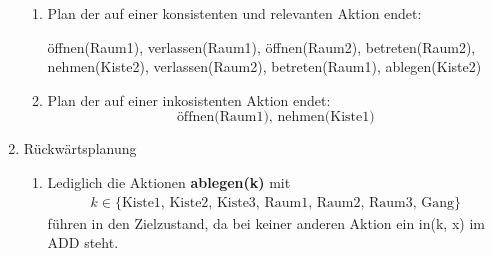 \documentclass[a4paper,10pt]{article}
\begin{document}
\begin{enumerate}[~~a.)]
\begin{enumerate}[~~i)]
        \item Plan der auf einer konsistenten und relevanten Aktion endet:
        \begin{center}
         öffnen(Raum1), verlassen(Raum1), öffnen(Raum2), betreten(Raum2), \\
         nehmen(Kiste2), verlassen(Raum2), betreten(Raum1), ablegen(Kiste2)
        \end{center}
        \item Plan der auf einer inkosistenten Aktion endet:
        $$\textrm{öffnen(Raum1), nehmen(Kiste1)}$$
    \end{enumerate}
    \item Rückwärtsplanung
    \begin{enumerate}[~~i)]
    	\item Lediglich die Aktionen \textbf{ablegen(k)} mit
    	\begin{align*}
    	k \in \{\text{Kiste1, Kiste2, Kiste3, Raum1, Raum2, Raum3, Gang}\}
    	\end{align*}
    	führen in den Zielzustand, da bei keiner anderen Aktion ein in(k, 			x) im ADD steht. 
    \end{enumerate}
\end{enumerate}
\end{document}
